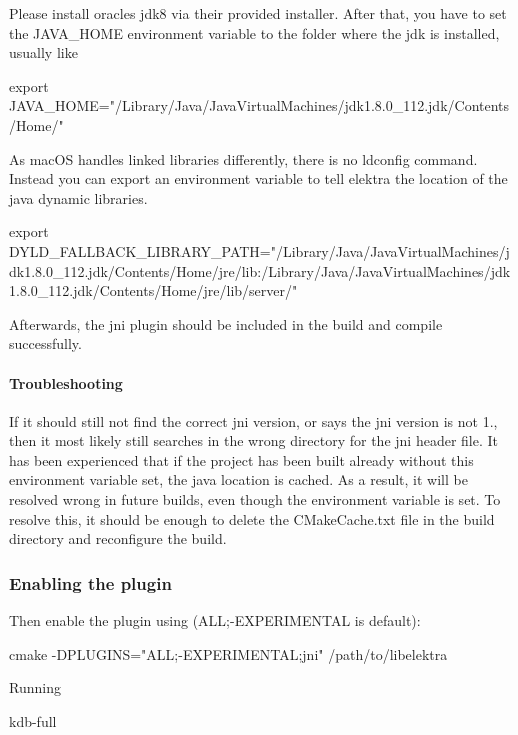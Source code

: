 Please install oracle\textquotesingle{}s jdk8 via their provided installer. After that, you have to set the J\+A\+V\+A\+\_\+\+H\+O\+ME environment variable to the folder where the jdk is installed, usually like \begin{DoxyVerb}    export JAVA_HOME="/Library/Java/JavaVirtualMachines/jdk1.8.0_112.jdk/Contents/Home/"
\end{DoxyVerb}


As mac\+OS handles linked libraries differently, there is no ldconfig command. Instead you can export an environment variable to tell elektra the location of the java dynamic libraries. \begin{DoxyVerb}    export DYLD_FALLBACK_LIBRARY_PATH="/Library/Java/JavaVirtualMachines/jdk1.8.0_112.jdk/Contents/Home/jre/lib:/Library/Java/JavaVirtualMachines/jdk1.8.0_112.jdk/Contents/Home/jre/lib/server/"
\end{DoxyVerb}


Afterwards, the jni plugin should be included in the build and compile successfully.

\paragraph*{Troubleshooting}

If it should still not find the correct jni version, or says the jni version is not 1., then it most likely still searches in the wrong directory for the jni header file. It has been experienced that if the project has been built already without this environment variable set, the java location is cached. As a result, it will be resolved wrong in future builds, even though the environment variable is set. To resolve this, it should be enough to delete the C\+Make\+Cache.\+txt file in the build directory and reconfigure the build.

\subsubsection*{Enabling the plugin}

Then enable the plugin using ({\ttfamily A\+LL;-\/\+E\+X\+P\+E\+R\+I\+M\+E\+N\+T\+AL} is default)\+: \begin{DoxyVerb}cmake -DPLUGINS="ALL;-EXPERIMENTAL;jni" /path/to/libelektra
\end{DoxyVerb}


Running \begin{DoxyVerb}kdb-full
\end{DoxyVerb}



